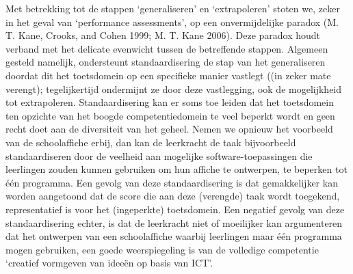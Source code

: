 \documentclass[
  letterpaper,
]{report}
\begin{document}
Met betrekking tot de stappen `generaliseren' en `extrapoleren' stoten
we, zeker in het geval van `performance assessments', op een
onvermijdelijke paradox (M. T. Kane, Crooks, and Cohen 1999; M. T. Kane
2006). Deze paradox houdt verband met het delicate evenwicht tussen de
betreffende stappen. Algemeen gesteld namelijk, ondersteunt
standaardisering de stap van het generaliseren doordat dit het
toetsdomein op een specifieke manier vastlegt ((in zeker mate verengt);
tegelijkertijd ondermijnt ze door deze vastlegging, ook de mogelijkheid
tot extrapoleren. Standaardisering kan er soms toe leiden dat het
toetsdomein ten opzichte van het boogde competentiedomein te veel
beperkt wordt en geen recht doet aan de diversiteit van het geheel.
Nemen we opnieuw het voorbeeld van de schoolaffiche erbij, dan kan de
leerkracht de taak bijvoorbeeld standaardiseren door de veelheid aan
mogelijke software-toepassingen die leerlingen zouden kunnen gebruiken
om hun affiche te ontwerpen, te beperken tot één programma. Een gevolg
van deze standaardisering is dat gemakkelijker kan worden aangetoond dat
de score die aan deze (verengde) taak wordt toegekend, representatief is
voor het (ingeperkte) toetsdomein. Een negatief gevolg van deze
standaardisering echter, is dat de leerkracht niet of moeilijker kan
argumenteren dat het ontwerpen van een schoolaffiche waarbij leerlingen
maar één programma mogen gebruiken, een goede weerspiegeling is van de
volledige competentie `creatief vormgeven van ideeën op basis van ICT'.
\end{document}
